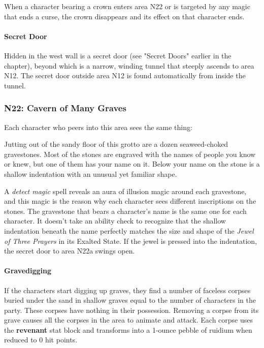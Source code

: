 \documentclass[a4paper, 11pt, bg=full, twocolumn, nooutline]{dndbook}
\begin{document}
When a character bearing a crown enters area N22 or is targeted by any magic that ends a curse, the crown disappears and its effect on that character ends.

\paragraph{Secret Door}

Hidden in the west wall is a secret door (see "Secret Doors" earlier in the chapter), beyond which is a narrow, winding tunnel that steeply ascends to area N12. The secret door outside area N12 is found automatically from inside the tunnel.

\subsubsection{N22: Cavern of Many Graves}

Each character who peers into this area sees the same thing:

\begin{DndReadAloud}
Jutting out of the sandy floor of this grotto are a dozen seaweed-choked gravestones. Most of the stones are engraved with the names of people you know or knew, but one of them has your name on it. Below your name on the stone is a shallow indentation with an unusual yet familiar shape.
\end{DndReadAloud}

A \textit{detect magic} spell reveals an aura of illusion magic around each gravestone, and this magic is the reason why each character sees different inscriptions on the stones. The gravestone that bears a character's name is the same one for each character. It doesn't take an ability check to recognize that the shallow indentation beneath the name perfectly matches the size and shape of the \textit{Jewel of Three Prayers} in its Exalted State. If the jewel is pressed into the indentation, the secret door to area N22a swings open.

\paragraph{Gravedigging}

If the characters start digging up graves, they find a number of faceless corpses buried under the sand in shallow graves equal to the number of characters in the party. These corpses have nothing in their possession. Removing a corpse from its grave causes all the corpses in the area to animate and attack. Each corpse uses the \textbf{revenant} stat block and transforms into a 1-ounce pebble of ruidium when reduced to 0 hit points.
\end{document}
